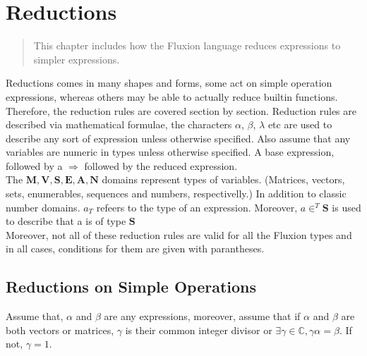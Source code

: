 \documentclass[11pt,a4paper]{book}
\begin{document}
\chapter{Reductions}

\vspace{1em}
\begin{quotation}
This chapter includes how the Fluxion language reduces expressions to simpler expressions.
\end{quotation}
\newpage

Reductions comes in many shapes and forms, some act on simple operation expressions, whereas others may be able to actually reduce builtin functions. Therefore, the reduction rules are covered section by section. Reduction rules are described via mathematical formulae, the characters $\alpha$, $\beta$, $\lambda$ etc are used to describe any sort of expression unless otherwise specified. Also assume that any variables are numeric in types unless otherwise specified. A base expression, followed by a $\Rightarrow$ followed by the reduced expression. \\

The $\mathbf{M}, \mathbf{V}, \mathbf{S}, \mathbf{E}, \mathbf{A}, \mathbf{N}$ domains represent types of variables. (Matrices, vectors, sets, enumerables, sequences and numbers, respectivelly.) In addition to classic number domains. $a_T$ refeers to the type of an expression. Moreover, $a \in^T \mathbf{S}$ is used to describe that a is of type $\mathbf{S}$ \\

Moreover, not all of these reduction rules are valid for all the Fluxion types and in all cases, conditions for them are given with parantheses.

\section{Reductions on Simple Operations}

Assume that, $\alpha$ and $\beta$ are any expressions, moreover, assume that if $\alpha$ and $\beta$ are both vectors or matrices, $\gamma$ is their common integer divisor or $\exists \gamma \in \mathbb{C}, \gamma\alpha = \beta$. If not, $\gamma = 1$.
\end{document}
